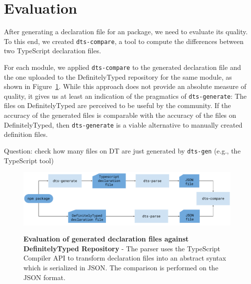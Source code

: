\documentclass[english,cleveref,autoref,submission]{programming}
\newenvironment{changethis}{%
  \begin{tcolorbox}[breakable,notitle,boxrule=0pt,colback=blue!20,colframe=blue!20]}{%
  \end{tcolorbox}}
\newcommand{\figref}[1]{Figure~\ref{#1}}
\begin{document}
\section{Evaluation}
\label{sec:dts-generate-evaluation}
After generating a declaration file for an \NPM{} package, we need to
evaluate its quality. To this end, we created \texttt{dts-compare}, a tool to compute the
differences between two TypeScript declaration files.

For each module, we applied \texttt{dts-compare} to the generated declaration file and the
one uploaded to the DefinitelyTyped repository for the same module, as shown in
\figref{fig:evaluation-diagram}. While this approach does not provide an absolute measure
of quality, it gives us at least an indication of the pragmatics of \texttt{dts-generate}:
The files on DefinitelyTyped are perceived to be useful by the community. If the accuracy
of the generated files is comparable with the accuracy of the files on DefinitelyTyped,
then \texttt{dts-generate} is a viable alternative to manually created definition files.

\begin{changethis}
  Question: check how many files on DT are just generated by \texttt{dts-gen} (e.g., the TypeScript tool)
\end{changethis}
 
\begin{figure}[tp]
    \begin{centering}
        {\includegraphics[width=1\textwidth]{evaluation-diagram.pdf}}
        \caption[Evaluation against DefinitelyTyped Repository]{\textbf{Evaluation of
            generated declaration files against DefinitelyTyped Repository} - The parser
          uses the TypeScript Compiler           API \cite{typescript-compiler-api} to
          transform declaration files into an abstract syntax which is serialized in
          JSON. The comparison is performed on the JSON format.} 
        \label{fig:evaluation-diagram}
    \end{centering}
\end{figure}
\end{document}
